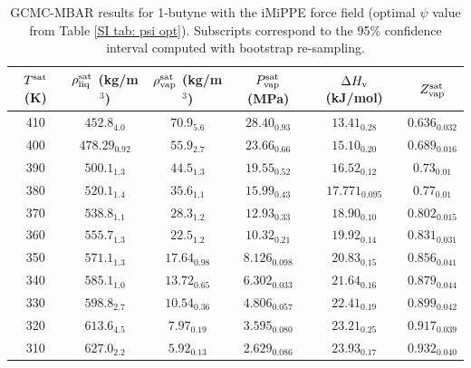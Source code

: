 \documentclass[journal=jctc,manuscript=article]{achemso}
\begin{document}
\begin{table}[htb!]
	\caption{GCMC-MBAR results for 1-butyne with the iMiPPE force field (optimal $\psi$ value from Table \ref{SI tab: psi opt}). Subscripts correspond to the 95\% confidence interval computed with bootstrap re-sampling.}
	\begin{center}
		\begin{tabular}{|c|c|c|c|c|c|}
			\hline
			$T^{\rm sat}$ (K) & $\rho_{\rm liq}^{\rm sat}$ (kg/m$^3$) & $\rho_{\rm vap}^{\rm sat}$ (kg/m$^3$) & $P_{\rm vap}^{\rm sat}$ (MPa) & $\Delta H_{\rm v}$ (kJ/mol) & $Z_{\rm vap}^{\rm sat}$ \\ \hline
			410 & $452.8_{4.0}$ & $70.9_{5.6}$ & $28.40_{0.93}$ & $13.41_{0.28}$ & $0.636_{0.032}$ \\
			400 & $478.29_{0.92}$ & $55.9_{2.7}$ & $23.66_{0.66}$ & $15.10_{0.20}$ & $0.689_{0.016}$ \\
			390 & $500.1_{1.3}$ & $44.5_{1.3}$ & $19.55_{0.52}$ & $16.52_{0.12}$ & $0.73_{0.01}$ \\
			380 & $520.1_{1.4}$ & $35.6_{1.1}$ & $15.99_{0.43}$ & $17.771_{0.095}$ & $0.77_{0.01}$ \\
			370 & $538.8_{1.1}$ & $28.3_{1.2}$ & $12.93_{0.33}$ & $18.90_{0.10}$ & $0.802_{0.015}$ \\
			360 & $555.7_{1.3}$ & $22.5_{1.2}$ & $10.32_{0.21}$ & $19.92_{0.14}$ & $0.831_{0.031}$ \\
			350 & $571.1_{1.3}$ & $17.64_{0.98}$ & $8.126_{0.098}$ & $20.83_{0.15}$ & $0.856_{0.041}$ \\
			340 & $585.1_{1.0}$ & $13.72_{0.65}$ & $6.302_{0.033}$ & $21.64_{0.16}$ & $0.879_{0.044}$ \\
			330 & $598.8_{2.7}$ & $10.54_{0.36}$ & $4.806_{0.057}$ & $22.41_{0.19}$ & $0.899_{0.042}$ \\
			320 & $613.6_{4.5}$ & $7.97_{0.19}$ & $3.595_{0.080}$ & $23.21_{0.25}$ & $0.917_{0.039}$ \\
			310 & $627.0_{2.2}$ & $5.92_{0.13}$ & $2.629_{0.086}$ & $23.93_{0.17}$ & $0.932_{0.040}$ \\
			\hline
		\end{tabular}
	\end{center}
\end{table}
\end{document}
